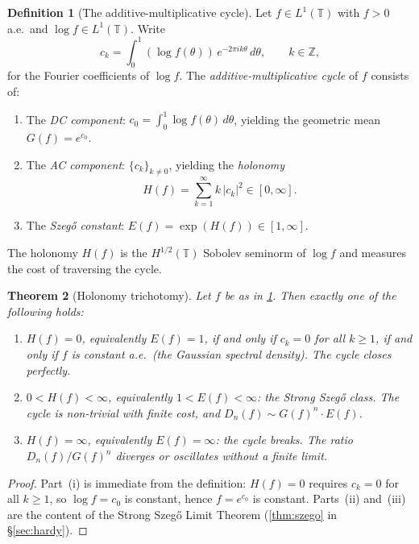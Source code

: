 \documentclass[12pt]{amsart}
\newtheorem{theorem}{Theorem}[section]
\theoremstyle{definition}
\newtheorem{definition}[theorem]{Definition}
\theoremstyle{remark}
\newcommand{\bT}{\mathbb{T}}
\newcommand{\Z}{\mathbb{Z}}
\begin{document}
\begin{definition}[The additive-multiplicative cycle]\label{def:cycle}
Let $f \in L^1(\bT)$ with $f > 0$ a.e.\ and $\log f \in L^1(\bT)$. Write
\[
c_k = \int_0^1 (\log f(\theta))\, e^{-2\pi i k\theta}\, d\theta, \qquad k \in \Z,
\]
for the Fourier coefficients of $\log f$. The \emph{additive-multiplicative cycle} of $f$ consists of:
\begin{enumerate}[label=(\roman*)]
\item The \emph{DC component}: $c_0 = \int_0^1 \log f(\theta)\, d\theta$, yielding the geometric mean $G(f) = e^{c_0}$.
\item The \emph{AC component}: $\{c_k\}_{k \neq 0}$, yielding the \emph{holonomy}
\begin{equation}\label{eq:holonomy}
H(f) = \sum_{k=1}^{\infty} k\, |c_k|^2 \in [0, \infty].
\end{equation}
\item The \emph{Szeg\H{o} constant}: $E(f) = \exp(H(f)) \in [1, \infty]$.
\end{enumerate}
The holonomy $H(f)$ is the $H^{1/2}(\bT)$ Sobolev seminorm of $\log f$ and measures the cost of traversing the cycle.
\end{definition}

\begin{theorem}[Holonomy trichotomy]\label{thm:holonomy-trichotomy}
Let $f$ be as in \cref{def:cycle}. Then exactly one of the following holds:
\begin{enumerate}[label=(\roman*)]
\item $H(f) = 0$, equivalently $E(f) = 1$, if and only if $c_k = 0$ for all $k \geq 1$, if and only if $f$ is constant a.e.\ (the Gaussian spectral density). The cycle closes perfectly.
\item $0 < H(f) < \infty$, equivalently $1 < E(f) < \infty$: the Strong Szeg\H{o} class. The cycle is non-trivial with finite cost, and $D_n(f) \sim G(f)^n \cdot E(f)$.
\item $H(f) = \infty$, equivalently $E(f) = \infty$: the cycle breaks. The ratio $D_n(f) / G(f)^n$ diverges or oscillates without a finite limit.
\end{enumerate}
\end{theorem}

\begin{proof}
Part~(i) is immediate from the definition: $H(f) = 0$ requires $c_k = 0$ for all $k \geq 1$, so $\log f = c_0$ is constant, hence $f = e^{c_0}$ is constant. Parts~(ii) and~(iii) are the content of the Strong Szeg\H{o} Limit Theorem (\cref{thm:szego} in \S\ref{sec:hardy}).
\end{proof}
\end{document}

